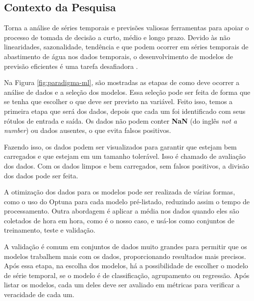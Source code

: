 \subsection{Contexto da Pesquisa} \label{subsec:contexto}
Torna a análise de séries temporais e previsões valiosas ferramentas para apoiar o processo de tomada de decisão a curto, médio e longo prazo. Devido às não linearidades, sazonalidade, tendência e que podem ocorrer em séries temporais de abastimento de água nos dados temporais, o desenvolvimento de modelos de previsão eficientes é uma tarefa desafiadora \cite{mateus}.

Na Figura \ref{fig:paradigma-ml}, são mostradas as etapas de como deve ocorrer a análise de dados e a seleção dos modelos. Essa seleção pode ser feita de forma que se tenha que escolher o que deve ser previsto na variável. Feito isso, temos a primeira etapa que será dos dados, depois que cada um foi identificado com seus rótulos de entrada e saída. Os dados não podem conter \textbf{NaN} (do inglês \textit{not a number}) ou dados ausentes, o que evita falsos positivos. 

Fazendo isso, os dados podem ser visualizados para garantir que estejam bem carregados e que estejam em um tamanho tolerável. Isso é chamado de avaliação dos dados. Com os dados limpos e bem carregados, sem falsos positivos, a divisão dos dados pode ser feita. 

A otimização dos dados para os modelos pode ser realizada de várias formas, como o uso do Optuna para cada modelo pré-listado, reduzindo assim o tempo de processamento. Outra abordagem é aplicar a média nos dados quando eles são coletados de hora em hora, como é o nosso caso, e usá-los como conjuntos de treinamento, teste e validação. 

A validação é comum em conjuntos de dados muito grandes para permitir que os modelos trabalhem mais com os dados, proporcionando resultados mais precisos. Após essa etapa, na escolha dos modelos, há a possibilidade de escolher o modelo de série temporal, se o modelo é de classificação, agrupamento ou regressão. Após listar os modelos, cada um deles deve ser avaliado em métricas para verificar a veracidade de cada um.


